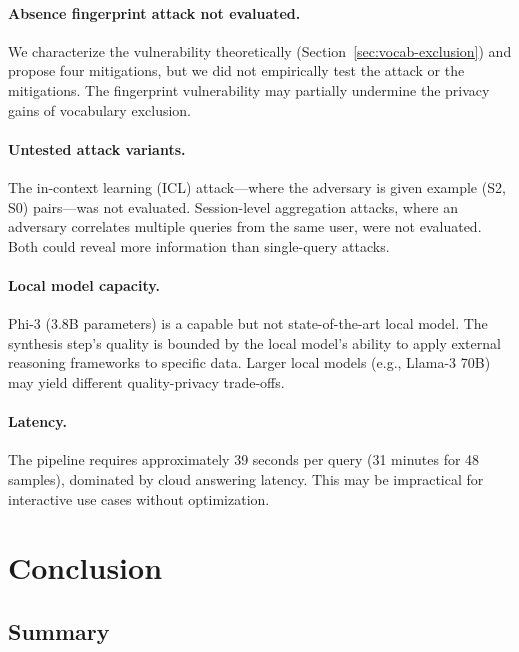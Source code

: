 \documentclass[sigconf,anonymous,review,balance=false]{acmart}
\begin{document}
\paragraph{Absence fingerprint attack not evaluated.} We characterize the vulnerability theoretically (Section~\ref{sec:vocab-exclusion}) and propose four mitigations, but we did not empirically test the attack or the mitigations. The fingerprint vulnerability may partially undermine the privacy gains of vocabulary exclusion.

\paragraph{Untested attack variants.} The in-context learning (ICL) attack---where the adversary is given example (S2, S0) pairs---was not evaluated. Session-level aggregation attacks, where an adversary correlates multiple queries from the same user, were not evaluated. Both could reveal more information than single-query attacks.

\paragraph{Local model capacity.} Phi-3 (3.8B parameters) is a capable but not state-of-the-art local model. The synthesis step's quality is bounded by the local model's ability to apply external reasoning frameworks to specific data. Larger local models (e.g., Llama-3 70B) may yield different quality-privacy trade-offs.

\paragraph{Latency.} The pipeline requires approximately 39 seconds per query (31 minutes for 48 samples), dominated by cloud answering latency. This may be impractical for interactive use cases without optimization.

\section{Conclusion}
\label{sec:conclusion}

\subsection{Summary}
\label{sec:summary}
\end{document}
